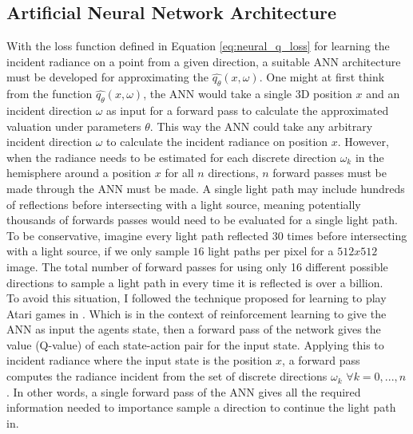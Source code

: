 \documentclass[../dissertation.tex]{subfiles}
\begin{document}
\subsection{Artificial Neural Network Architecture}

With the loss function defined in Equation \ref{eq:neural_q_loss} for learning the incident radiance on a point from a given direction, a suitable ANN architecture must be developed for approximating the $\hat{q_\theta}(x,\omega)$. One might at first think from the function $\hat{q_\theta}(x, \omega)$, the ANN would take a single 3D position $x$ and an incident direction $\omega$ as input for a forward pass to calculate the approximated valuation under parameters $\theta$. This way the ANN could take any arbitrary incident direction $\omega$ to calculate the incident radiance on position $x$. However, when the radiance needs to be estimated for each discrete direction $\omega_k$ in the hemisphere around a position $x$ for all $n$ directions, $n$ forward passes must be made through the ANN must be made. A single light path may include hundreds of reflections before intersecting with a light source, meaning potentially thousands of forwards passes would need to be evaluated for a single light path. To be conservative, imagine every light path reflected 30 times before intersecting with a light source, if we only sample $16$ light paths per pixel for a $512x512$ image. The total number of forward passes for using only 16 different possible directions to sample a light path in every time it is reflected is over a billion.\\

To avoid this situation, I followed the technique proposed for learning to play Atari games in \cite{mnih2013playing}. Which is in the context of reinforcement learning to give the ANN as input the agents state, then a forward pass of the network gives the value (Q-value) of each state-action pair for the input state. Applying this to incident radiance where the input state is the position $x$, a forward pass computes the radiance incident from the set of discrete directions $\omega_k$ $\forall k = 0, ..., n$.  In other words, a single forward pass of the ANN gives all the required information needed to importance sample a direction to continue the light path in.\\
\end{document}

